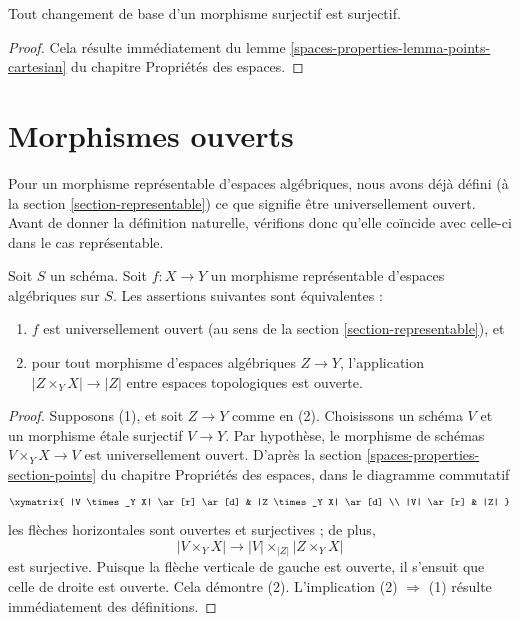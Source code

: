 \begin{lemma}
\label{lemma-base-change-surjective}
Tout changement de base d'un morphisme surjectif est surjectif.
\end{lemma}

\begin{proof}
Cela résulte immédiatement du
lemme \ref{spaces-properties-lemma-points-cartesian} du chapitre Propriétés des espaces.
\end{proof}










\section{Morphismes ouverts}
\label{section-open}

\noindent
Pour un morphisme représentable d'espaces algébriques, nous avons déjà défini (à la
section \ref{section-representable})
ce que signifie être universellement ouvert. Avant de donner la définition
naturelle, vérifions donc qu'elle coïncide avec celle-ci dans le cas représentable.

\begin{lemma}
\label{lemma-characterize-representable-universally-open}
Soit $S$ un schéma. Soit $f : X \to Y$ un morphisme représentable
d'espaces algébriques sur $S$. Les assertions suivantes sont équivalentes :
\begin{enumerate}
\item $f$ est universellement ouvert
(au sens de la section \ref{section-representable}), et
\item pour tout morphisme d'espaces algébriques $Z \to Y$, l'application
$|Z \times_Y X| \to |Z|$ entre espaces topologiques est ouverte.
\end{enumerate}
\end{lemma}

\begin{proof}
Supposons (1), et soit $Z \to Y$ comme en (2). Choisissons un schéma $V$ et
un morphisme \'etale surjectif $V \to Y$. Par hypothèse, le morphisme de
schémas $V \times_Y X \to V$ est universellement ouvert. D'après la
section \ref{spaces-properties-section-points} du chapitre Propriétés des espaces,
dans le diagramme commutatif
$$
\xymatrix{
|V \times_Y X| \ar[r] \ar[d] & |Z \times_Y X| \ar[d] \\
|V| \ar[r] & |Z|
}
$$
les flèches horizontales sont ouvertes et surjectives ; de plus,
$$
|V \times_Y X| \longrightarrow |V| \times_{|Z|} |Z \times_Y X|
$$
est surjective. Puisque la flèche verticale de gauche
est ouverte, il s'ensuit que celle de droite est
ouverte. Cela démontre (2). L'implication (2) $\Rightarrow$ (1) résulte
immédiatement des définitions.
\end{proof}

